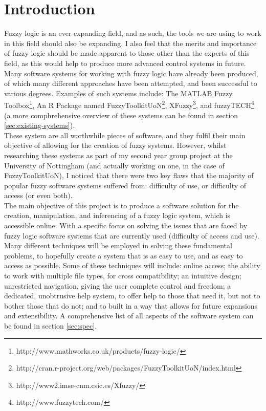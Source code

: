 \section{Introduction}
Fuzzy logic is an ever expanding field, and as such, the tools we are using to work in this field should also be expanding. I also feel that the merits and importance of fuzzy logic should be made apparent to those other than the experts of this field, as this would help to produce more advanced control systems in future.\\

Many software systems for working with fuzzy logic have already been produced, of which many different approaches have been attempted, and been successful to various degrees. Examples of such systems include: The MATLAB Fuzzy Toolbox\footnote{http://www.mathworks.co.uk/products/fuzzy-logic/}, An R Package named  FuzzyToolkitUoN\footnote{http://cran.r-project.org/web/packages/FuzzyToolkitUoN/index.html}, XFuzzy\footnote{http://www2.imse-cnm.csic.es/Xfuzzy/}, and fuzzyTECH\footnote{http://www.fuzzytech.com/} (a more comphrehensive overview of these systems can be found in section \ref{sec:existing-systems}).\\

These system are all worthwhile pieces of software, and they fulfil their main objective of allowing for the creation of fuzzy systems. However, whilst researching these systems as part of my second year group project at the University of Nottingham (and actually working on one, in the case of FuzzyToolkitUoN), I noticed that there were two key flaws that the majority of popular fuzzy software systems suffered from: difficulty of use, or difficulty of access (or even both). \\

The main objective of this project is to produce a software solution for the creation, manipulation, and inferencing of a fuzzy logic system, which is accessible online. With a specific focus on solving the issues that are faced by fuzzy logic software systems that are currently used (difficulty of access and use). \\

Many different techniques will be employed in solving these fundamental problems, to hopefully create a system that is as easy to use, and as easy to access as possible. Some of these techniques will include: online access; the ability to work with multiple file types, for cross compatibility; an intuitive design; unrestricted navigation, giving the user complete control and freedom; a dedicated, unobtrusive help system, to offer help to those that need it, but not to bother those that do not; and to built in a way that allows for future expansions and extensibility. A comprehensive list of all aspects of the software system can be found in section \ref{sec:spec}.\\


